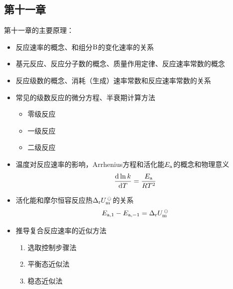 \documentclass[9pt]{beamer}
\newcommand\B{{\rm B}}
\newcommand*{\dif}{\mathop{}\!\mathrm{d}}
\newcommand\m{{\rm m}}
\newcommand\rr{{\rm r}}
\begin{document}
	\subsection{第十一章}
	\begin{frame}
	
	第十一章的主要原理：
	\begin{itemize}
	
	\item 反应速率的概念、和组分$\B$的变化速率的关系
		
	\item 基元反应、反应分子数的概念、质量作用定律、反应速率常数的概念
	
	\item 反应级数的概念、消耗（生成）速率常数和反应速率常数的关系
	
	\item 常见的级数反应的微分方程、半衰期计算方法
		\begin{itemize}
	
		\item 零级反应
		
		\item 一级反应
		
		\item 二级反应
	
		\end{itemize}
		
	\item 温度对反应速率的影响，Arrhenius方程和活化能$E_{\rm a}$的概念和物理意义
	\[
		\frac{ \dif \ln{k} }{ \dif T } = \frac{ E_{\rm a} }{ RT^2 }
	\]
	
	\item 活化能和摩尔恒容反应热$\Delta_\rr U^{\,\ominus}_\m$的关系
	\[
		E_{\rm a,1} - E_{\rm a,-1} = \Delta_\rr U^{\,\ominus}_\m
	\]
	
	\item 推导复合反应速率的近似方法
		\begin{enumerate}
		
		\item 选取控制步骤法
	
		\item 平衡态近似法
		
		\item 稳态近似法
	
		\end{enumerate}		
	
	
	\end{itemize}
	
	\end{frame}
	
\end{document}

